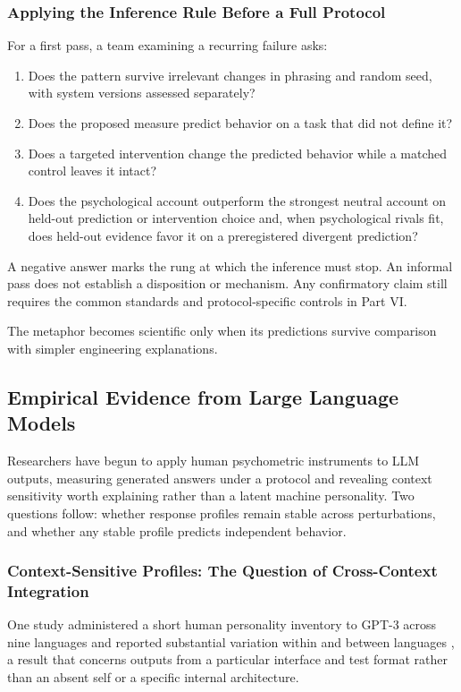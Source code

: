\documentclass{article}
\begin{document}
\subsubsection{Applying the Inference Rule Before a Full Protocol}\label{sec:practical-pass}
For a first pass, a team examining a recurring failure asks:
\begin{enumerate}
    \item Does the pattern survive irrelevant changes in phrasing and random seed, with system versions assessed separately?
    \item Does the proposed measure predict behavior on a task that did not define it?
    \item Does a targeted intervention change the predicted behavior while a matched control leaves it intact?
    \item Does the psychological account outperform the strongest neutral account on held-out prediction or intervention choice and, when psychological rivals fit, does held-out evidence favor it on a preregistered divergent prediction?
\end{enumerate}
A negative answer marks the rung at which the inference must stop. An informal pass does not establish a disposition or mechanism. Any confirmatory claim still requires the common standards and protocol-specific controls in Part VI.

The metaphor becomes scientific only when its predictions survive comparison with simpler engineering explanations.

\subsection{Empirical Evidence from Large Language Models}
Researchers have begun to apply human psychometric instruments to LLM outputs, measuring generated answers under a protocol and revealing context sensitivity worth explaining rather than a latent machine personality. Two questions follow: whether response profiles remain stable across perturbations, and whether any stable profile predicts independent behavior.

\subsubsection{Context-Sensitive Profiles: The Question of Cross-Context Integration}
One study administered a short human personality inventory to GPT-3 across nine languages and reported substantial variation within and between languages \citep{ref21}, a result that concerns outputs from a particular interface and test format rather than an absent self or a specific internal architecture.
\end{document}
